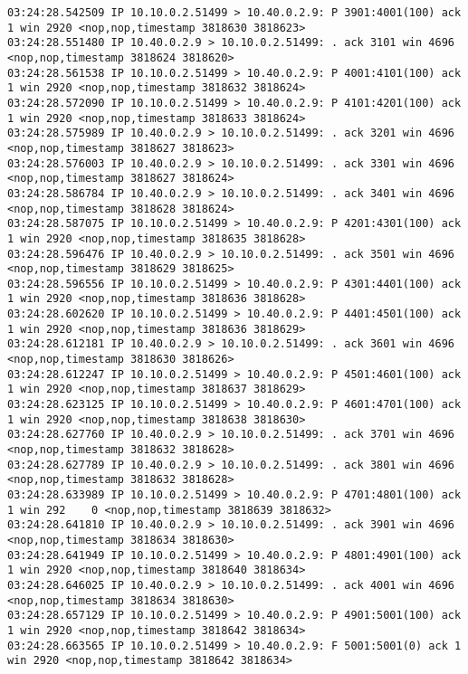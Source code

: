 \documentclass[a4paper,12pt]{article}
\begin{document}
\begin{lstlisting}
03:24:28.542509 IP 10.10.0.2.51499 > 10.40.0.2.9: P 3901:4001(100) ack 1 win 2920 <nop,nop,timestamp 3818630 3818623>
03:24:28.551480 IP 10.40.0.2.9 > 10.10.0.2.51499: . ack 3101 win 4696 <nop,nop,timestamp 3818624 3818620>
03:24:28.561538 IP 10.10.0.2.51499 > 10.40.0.2.9: P 4001:4101(100) ack 1 win 2920 <nop,nop,timestamp 3818632 3818624>
03:24:28.572090 IP 10.10.0.2.51499 > 10.40.0.2.9: P 4101:4201(100) ack 1 win 2920 <nop,nop,timestamp 3818633 3818624>
03:24:28.575989 IP 10.40.0.2.9 > 10.10.0.2.51499: . ack 3201 win 4696 <nop,nop,timestamp 3818627 3818623>
03:24:28.576003 IP 10.40.0.2.9 > 10.10.0.2.51499: . ack 3301 win 4696 <nop,nop,timestamp 3818627 3818624>
03:24:28.586784 IP 10.40.0.2.9 > 10.10.0.2.51499: . ack 3401 win 4696 <nop,nop,timestamp 3818628 3818624>
03:24:28.587075 IP 10.10.0.2.51499 > 10.40.0.2.9: P 4201:4301(100) ack 1 win 2920 <nop,nop,timestamp 3818635 3818628>
03:24:28.596476 IP 10.40.0.2.9 > 10.10.0.2.51499: . ack 3501 win 4696 <nop,nop,timestamp 3818629 3818625>
03:24:28.596556 IP 10.10.0.2.51499 > 10.40.0.2.9: P 4301:4401(100) ack 1 win 2920 <nop,nop,timestamp 3818636 3818628>
03:24:28.602620 IP 10.10.0.2.51499 > 10.40.0.2.9: P 4401:4501(100) ack 1 win 2920 <nop,nop,timestamp 3818636 3818629>
03:24:28.612181 IP 10.40.0.2.9 > 10.10.0.2.51499: . ack 3601 win 4696 <nop,nop,timestamp 3818630 3818626>
03:24:28.612247 IP 10.10.0.2.51499 > 10.40.0.2.9: P 4501:4601(100) ack 1 win 2920 <nop,nop,timestamp 3818637 3818629>
03:24:28.623125 IP 10.10.0.2.51499 > 10.40.0.2.9: P 4601:4701(100) ack 1 win 2920 <nop,nop,timestamp 3818638 3818630>
03:24:28.627760 IP 10.40.0.2.9 > 10.10.0.2.51499: . ack 3701 win 4696 <nop,nop,timestamp 3818632 3818628>
03:24:28.627789 IP 10.40.0.2.9 > 10.10.0.2.51499: . ack 3801 win 4696 <nop,nop,timestamp 3818632 3818628>
03:24:28.633989 IP 10.10.0.2.51499 > 10.40.0.2.9: P 4701:4801(100) ack 1 win 292    0 <nop,nop,timestamp 3818639 3818632>
03:24:28.641810 IP 10.40.0.2.9 > 10.10.0.2.51499: . ack 3901 win 4696 <nop,nop,timestamp 3818634 3818630>
03:24:28.641949 IP 10.10.0.2.51499 > 10.40.0.2.9: P 4801:4901(100) ack 1 win 2920 <nop,nop,timestamp 3818640 3818634>
03:24:28.646025 IP 10.40.0.2.9 > 10.10.0.2.51499: . ack 4001 win 4696 <nop,nop,timestamp 3818634 3818630>
03:24:28.657129 IP 10.10.0.2.51499 > 10.40.0.2.9: P 4901:5001(100) ack 1 win 2920 <nop,nop,timestamp 3818642 3818634>
03:24:28.663565 IP 10.10.0.2.51499 > 10.40.0.2.9: F 5001:5001(0) ack 1 win 2920 <nop,nop,timestamp 3818642 3818634>


\end{lstlisting}
\end{document}
